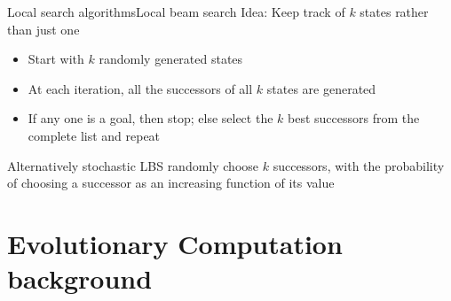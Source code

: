 \documentclass[10pt,compress]{beamer} %
\begin{document}
\begin{frame}{Local search algorithms}{Local beam search}
    Idea: Keep track of $k$ states rather than just one
    \begin{itemize}
        \item Start with $k$ randomly generated states
        \item At each iteration, all the successors of all $k$ states are generated
        \item If any one is a goal, then stop; else select the $k$ best successors from the complete list and repeat
    \end{itemize}
    Alternatively stochastic LBS randomly choose $k$ successors, with the probability of choosing a successor as an increasing function of its value
\end{frame}

\section{Evolutionary Computation background}
\end{document}
